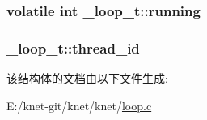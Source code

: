 \subsubsection[{running}]{\setlength{\rightskip}{0pt plus 5cm}volatile int \+\_\+loop\+\_\+t\+::running}\label{a00025_abfb04cce945320081c75c19b6898a7cf_abfb04cce945320081c75c19b6898a7cf}
\hypertarget{a00025_aa52cbdff546a9e2868d2b3397e68d6dd_aa52cbdff546a9e2868d2b3397e68d6dd}{}
\subsubsection[{thread\+\_\+id}]{ \+\_\+loop\+\_\+t\+::thread\+\_\+id}\label{a00025_aa52cbdff546a9e2868d2b3397e68d6dd_aa52cbdff546a9e2868d2b3397e68d6dd}


该结构体的文档由以下文件生成\+:\begin{DoxyCompactItemize}
\item 
E\+:/knet-\/git/knet/knet/\hyperlink{a00052}{loop.\+c}\end{DoxyCompactItemize}
